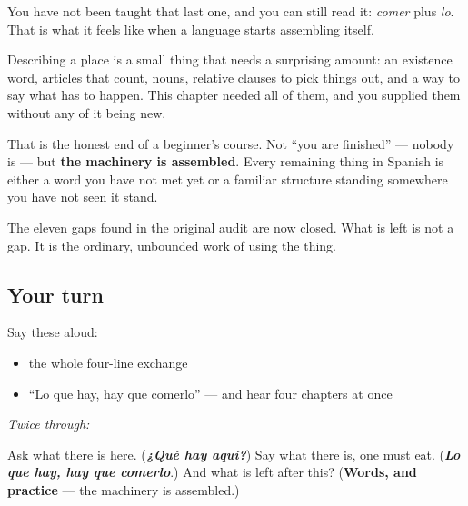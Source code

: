 You have not been taught that last one, and you can still read it: \emph{comer} plus \emph{lo}. That is what it feels like when a language starts assembling itself.

\begin{grammarlens}[title={Grammar Lens: what you can do now}]
Describing a place is a small thing that needs a surprising amount: an existence word, articles that count, nouns, relative clauses to pick things out, and a way to say what has to happen. This chapter needed all of them, and you supplied them without any of it being new.

That is the honest end of a beginner's course. Not \textquotedblleft{}you are finished\textquotedblright{} — nobody is — but \textbf{the machinery is assembled}. Every remaining thing in Spanish is either a word you have not met yet or a familiar structure standing somewhere you have not seen it stand.

The eleven gaps found in the original audit are now closed. What is left is not a gap. It is the ordinary, unbounded work of using the thing.
\end{grammarlens}

\subsection*{Your turn}
Say these aloud:

\begin{itemize}
\raggedright
  \item the whole four-line exchange
  \item \textquotedblleft{}Lo que hay, hay que comerlo\textquotedblright{} — and hear four chapters at once
\end{itemize}

\emph{Twice through:}

\begin{tcolorbox}[breakable,colback=teal!4,colframe=teal!35!black,title={Before you move on}]
Ask what there is here. (\emph{\textbf{¿Qué hay aquí?}}) Say what there is, one must eat. (\emph{\textbf{Lo que hay, hay que comerlo}}.) And what is left after this? (\textbf{Words, and practice} — the machinery is assembled.)
\end{tcolorbox}
